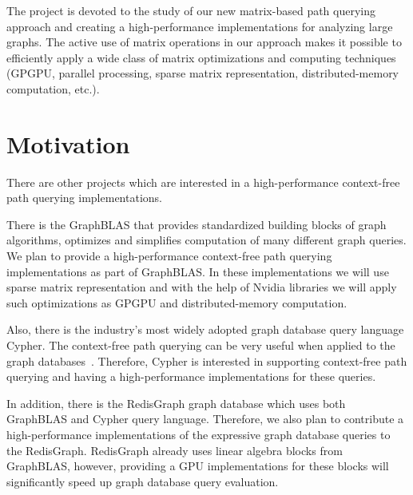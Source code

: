 \documentclass[12pt]{article}  %
\theoremstyle{remark}
\begin{document}
The project is devoted to the study of our new matrix-based path querying approach and creating a high-performance implementations for analyzing large graphs. The active use of matrix operations in our approach makes it possible to efficiently apply a wide class of matrix optimizations and computing techniques (GPGPU, parallel processing, sparse matrix representation, distributed-memory computation, etc.).

\section{Motivation}
There are other projects which are interested in a high-performance context-free path querying implementations.

There is the GraphBLAS that provides standardized building blocks of graph algorithms, optimizes and simplifies computation of many different graph queries. We plan to provide a high-performance context-free path querying implementations as part of GraphBLAS. In these implementations we will use sparse matrix representation and with the help of Nvidia libraries we will apply such optimizations as GPGPU and distributed-memory computation.

Also, there is the industry’s most widely adopted graph database query language Cypher. The context-free path querying can be very useful when applied to the graph databases~\cite{kuijpers2019experimental}. Therefore, Cypher is interested in supporting context-free path querying and having a high-performance implementations for these queries.

In addition, there is the RedisGraph graph database which uses both GraphBLAS and Cypher query language. Therefore, we also plan to contribute a high-performance implementations of the expressive graph database queries to the RedisGraph. RedisGraph already uses linear algebra blocks from GraphBLAS, however, providing a GPU implementations for these blocks will significantly speed up graph database query evaluation.


\end{document}
